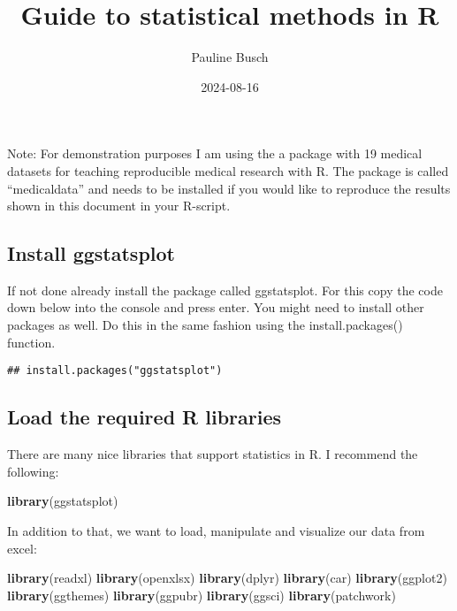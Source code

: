 \documentclass[
]{article}
\title{Guide to statistical methods in R}
\author{Pauline Busch}
\date{2024-08-16}
\newenvironment{Shaded}{\begin{snugshade}}{\end{snugshade}}
\newcommand{\FunctionTok}[1]{\textcolor[rgb]{0.13,0.29,0.53}{\textbf{#1}}}
\newcommand{\NormalTok}[1]{#1}
\begin{document}
\maketitle

{
\setcounter{tocdepth}{2}
\tableofcontents
}
Note: For demonstration purposes I am using the a package with 19
medical datasets for teaching reproducible medical research with R. The
package is called ``medicaldata'' and needs to be installed if you would
like to reproduce the results shown in this document in your R-script.

\subsection{Install ggstatsplot}\label{install-ggstatsplot}

If not done already install the package called ggstatsplot. For this
copy the code down below into the console and press enter. You might
need to install other packages as well. Do this in the same fashion
using the install.packages() function.

\begin{verbatim}
## install.packages("ggstatsplot")
\end{verbatim}

\subsection{Load the required R
libraries}\label{load-the-required-r-libraries}

There are many nice libraries that support statistics in R. I recommend
the following:

\begin{Shaded}
\begin{Highlighting}[]
\FunctionTok{library}\NormalTok{(ggstatsplot)}
\end{Highlighting}
\end{Shaded}

In addition to that, we want to load, manipulate and visualize our data
from excel:

\begin{Shaded}
\begin{Highlighting}[]
\FunctionTok{library}\NormalTok{(readxl)}
\FunctionTok{library}\NormalTok{(openxlsx)}
\FunctionTok{library}\NormalTok{(dplyr)}
\FunctionTok{library}\NormalTok{(car)}
\FunctionTok{library}\NormalTok{(ggplot2)}
\FunctionTok{library}\NormalTok{(ggthemes)}
\FunctionTok{library}\NormalTok{(ggpubr)}
\FunctionTok{library}\NormalTok{(ggsci)}
\FunctionTok{library}\NormalTok{(patchwork)  }
\end{Highlighting}
\end{Shaded}
\end{document}
